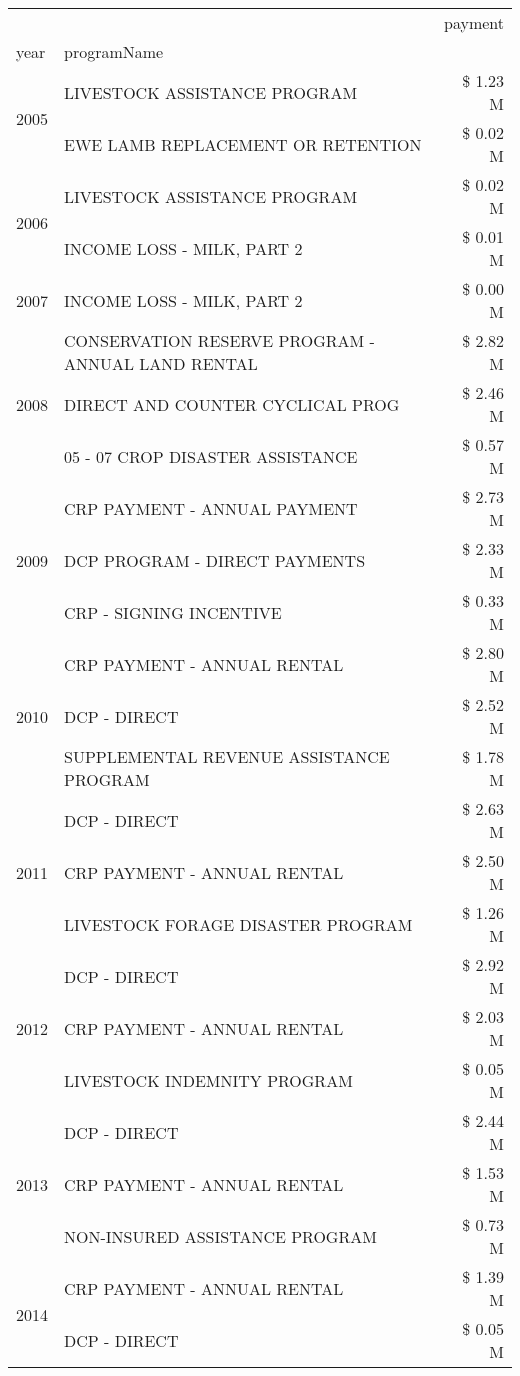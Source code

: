 \begin{tabular}{llr}
\toprule
 &  & payment \\
year & programName &  \\
\midrule
\multirow[t]{2}{*}{2005} & LIVESTOCK ASSISTANCE PROGRAM & \$ 1.23 M \\
 & EWE LAMB REPLACEMENT OR RETENTION & \$ 0.02 M \\
\cline{1-3}
\multirow[t]{2}{*}{2006} & LIVESTOCK ASSISTANCE PROGRAM & \$ 0.02 M \\
 & INCOME LOSS - MILK, PART 2 & \$ 0.01 M \\
\cline{1-3}
2007 & INCOME LOSS - MILK, PART 2 & \$ 0.00 M \\
\cline{1-3}
\multirow[t]{3}{*}{2008} & CONSERVATION RESERVE PROGRAM - ANNUAL LAND RENTAL & \$ 2.82 M \\
 & DIRECT AND COUNTER CYCLICAL PROG & \$ 2.46 M \\
 & 05 - 07 CROP DISASTER ASSISTANCE & \$ 0.57 M \\
\cline{1-3}
\multirow[t]{3}{*}{2009} & CRP PAYMENT - ANNUAL PAYMENT & \$ 2.73 M \\
 & DCP PROGRAM - DIRECT PAYMENTS & \$ 2.33 M \\
 & CRP - SIGNING INCENTIVE & \$ 0.33 M \\
\cline{1-3}
\multirow[t]{3}{*}{2010} & CRP PAYMENT - ANNUAL RENTAL & \$ 2.80 M \\
 & DCP - DIRECT & \$ 2.52 M \\
 & SUPPLEMENTAL REVENUE ASSISTANCE PROGRAM & \$ 1.78 M \\
\cline{1-3}
\multirow[t]{3}{*}{2011} & DCP - DIRECT & \$ 2.63 M \\
 & CRP PAYMENT - ANNUAL RENTAL & \$ 2.50 M \\
 & LIVESTOCK FORAGE DISASTER PROGRAM & \$ 1.26 M \\
\cline{1-3}
\multirow[t]{3}{*}{2012} & DCP - DIRECT & \$ 2.92 M \\
 & CRP PAYMENT - ANNUAL RENTAL & \$ 2.03 M \\
 & LIVESTOCK INDEMNITY PROGRAM & \$ 0.05 M \\
\cline{1-3}
\multirow[t]{3}{*}{2013} & DCP - DIRECT & \$ 2.44 M \\
 & CRP PAYMENT - ANNUAL RENTAL & \$ 1.53 M \\
 & NON-INSURED ASSISTANCE PROGRAM & \$ 0.73 M \\
\cline{1-3}
\multirow[t]{3}{*}{2014} & CRP PAYMENT - ANNUAL RENTAL & \$ 1.39 M \\
 & DCP - DIRECT & \$ 0.05 M \\

\end{tabular}
